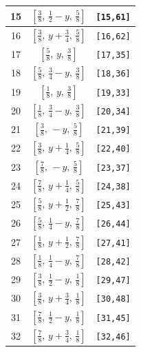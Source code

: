 \documentclass[fleqn,8pt]{jsarticle}
\begin{document}
\begin{longtable}{ccc}
15 & $\left[ \frac{3}{8},\, \frac{1}{2} - y,\, \frac{5}{8} \right]$ & {\tt [15,61]} \\ \hline
16 & $\left[ \frac{3}{8},\, y + \frac{3}{4},\, \frac{5}{8} \right]$ & {\tt [16,62]} \\ \hline
17 & $\left[ \frac{5}{8},\, y,\, \frac{3}{8} \right]$ & {\tt [17,35]} \\ \hline
18 & $\left[ \frac{5}{8},\, \frac{3}{4} - y,\, \frac{3}{8} \right]$ & {\tt [18,36]} \\ \hline
19 & $\left[ \frac{1}{8},\, y,\, \frac{3}{8} \right]$ & {\tt [19,33]} \\ \hline
20 & $\left[ \frac{1}{8},\, \frac{3}{4} - y,\, \frac{3}{8} \right]$ & {\tt [20,34]} \\ \hline
21 & $\left[ \frac{3}{8},\, - y,\, \frac{5}{8} \right]$ & {\tt [21,39]} \\ \hline
22 & $\left[ \frac{3}{8},\, y + \frac{1}{4},\, \frac{5}{8} \right]$ & {\tt [22,40]} \\ \hline
23 & $\left[ \frac{7}{8},\, - y,\, \frac{5}{8} \right]$ & {\tt [23,37]} \\ \hline
24 & $\left[ \frac{7}{8},\, y + \frac{1}{4},\, \frac{5}{8} \right]$ & {\tt [24,38]} \\ \hline
25 & $\left[ \frac{5}{8},\, y + \frac{1}{2},\, \frac{7}{8} \right]$ & {\tt [25,43]} \\ \hline
26 & $\left[ \frac{5}{8},\, \frac{1}{4} - y,\, \frac{7}{8} \right]$ & {\tt [26,44]} \\ \hline
27 & $\left[ \frac{1}{8},\, y + \frac{1}{2},\, \frac{7}{8} \right]$ & {\tt [27,41]} \\ \hline
28 & $\left[ \frac{1}{8},\, \frac{1}{4} - y,\, \frac{7}{8} \right]$ & {\tt [28,42]} \\ \hline
29 & $\left[ \frac{3}{8},\, \frac{1}{2} - y,\, \frac{1}{8} \right]$ & {\tt [29,47]} \\ \hline
30 & $\left[ \frac{3}{8},\, y + \frac{3}{4},\, \frac{1}{8} \right]$ & {\tt [30,48]} \\ \hline
31 & $\left[ \frac{7}{8},\, \frac{1}{2} - y,\, \frac{1}{8} \right]$ & {\tt [31,45]} \\ \hline
32 & $\left[ \frac{7}{8},\, y + \frac{3}{4},\, \frac{1}{8} \right]$ & {\tt [32,46]} \\
\end{longtable}
\renewcommand{\arraystretch}{1.2}
\end{document}
